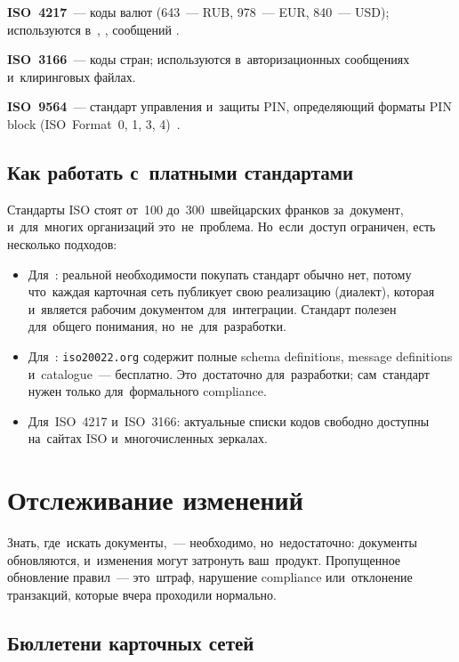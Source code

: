 \textbf{ISO~4217}~--- коды валют (643~--- RUB, 978~--- EUR,
840~--- USD); используются в~, , 
сообщений .

\textbf{ISO~3166}~--- коды стран; используются
в~авторизационных сообщениях и~клиринговых файлах.

\textbf{ISO~9564}~--- стандарт управления и~защиты PIN,
определяющий форматы PIN block (ISO~Format~0, 1, 3,
4)~.

\subsection*{Как работать с~платными стандартами}

Стандарты ISO стоят от~100 до~300~швейцарских франков
за~документ, и~для~многих организаций это~не~проблема.
Но~если~доступ ограничен, есть несколько подходов:

\begin{itemize}
  \item Для~: реальной необходимости покупать
        стандарт обычно нет, потому что~каждая карточная сеть
        публикует свою реализацию (диалект), которая и~является
        рабочим документом для~интеграции. Стандарт полезен
        для~общего понимания, но~не~для~разработки.
  \item Для~: \texttt{iso20022.org} содержит
        полные schema definitions, message definitions
        и~catalogue~--- бесплатно. Это~достаточно для~разработки;
        сам~стандарт нужен только для~формального compliance.
  \item Для~ISO~4217 и~ISO~3166: актуальные списки кодов
        свободно доступны на~сайтах ISO и~многочисленных
        зеркалах.
\end{itemize}


\section{Отслеживание изменений}
\label{sec:ps-tracking}

Знать, где~искать документы,~--- необходимо, но~недостаточно:
документы обновляются, и~изменения могут затронуть ваш~продукт.
Пропущенное обновление правил~--- это~штраф, нарушение
compliance или~отклонение транзакций, которые вчера проходили
нормально.

\subsection*{Бюллетени карточных сетей}

